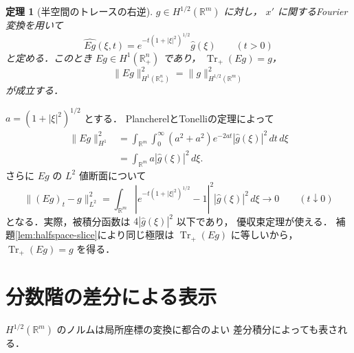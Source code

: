 \documentclass[a5paper,10pt,onecolumn]{jsarticle}
\makeatletter
\theoremstyle{mathnotetheorem}
\newtheorem{theorem}{定理}[section]
\renewcommand{\proofname}{証明}
\renewenvironment{proof}[1][\proofname]{%
  \par\pushQED{\qed}\normalfont\topsep4\p@\@plus2\p@\relax
  \trivlist\item[\hskip\labelsep\bfseries #1]\ignorespaces
}{\popQED\endtrivlist\@endpefalse}
\newcommand{\norm}[1]{\lVert #1\rVert}
\makeatother
\begin{document}
\begin{theorem}[半空間のトレースの右逆]
$g\in H^{1/2}(\mathbb R^m)$ に対し，
$x'$ に関するFourier変換を用いて
\[
 \widehat{Eg}(\xi,t)=e^{-t(1+|\xi|^2)^{1/2}}\widehat g(\xi)
 \qquad(t>0)
\]
と定める．このとき $Eg\in H^1(\mathbb R^n_+)$ であり，
$\operatorname{Tr}_+(Eg)=g$，
\[
 \norm{Eg}_{H^1(\mathbb R^n_+)}^2
 =\norm g_{H^{1/2}(\mathbb R^m)}^2
\]
が成立する．
\end{theorem}
\begin{proof}
$a=(1+|\xi|^2)^{1/2}$ とする．
PlancherelとTonelliの定理によって
\[
 \begin{aligned}
 \norm{Eg}_{H^1}^2
 &=\int_{\mathbb R^m}\int_0^\infty
   (a^2+a^2)e^{-2at}|\widehat g(\xi)|^2\,dt\,d\xi\\
 &=\int_{\mathbb R^m}a|\widehat g(\xi)|^2\,d\xi.
 \end{aligned}
\]
さらに $Eg$ の $L^2$ 値断面について
\[
 \norm{(Eg)_t-g}_{L^2}^2
 =\int_{\mathbb R^m}
   |e^{-t(1+|\xi|^2)^{1/2}}-1|^2
   |\widehat g(\xi)|^2\,d\xi
 \longrightarrow0\qquad(t\downarrow0)
\]
となる．実際，被積分函数は
$4|\widehat g(\xi)|^2$ 以下であり，
優収束定理が使える．
補題\ref{lem:halfspace-slice}により同じ極限は
$\operatorname{Tr}_+(Eg)$ に等しいから，
$\operatorname{Tr}_+(Eg)=g$ を得る．
\end{proof}

\section{分数階の差分による表示}
$H^{1/2}(\mathbb R^m)$ のノルムは局所座標の変換に都合のよい
差分積分によっても表される．
\end{document}
